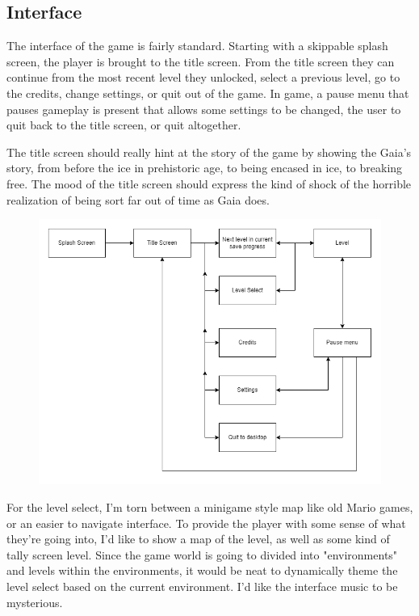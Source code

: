 \documentclass[12pt]{report}
\begin{document}
\pagebreak
\subsection*{Interface}

The interface of the game is fairly standard. Starting with a skippable splash screen,
the player is brought to the title screen. From the title screen they can continue from 
the most recent level they unlocked, select a previous level, go to the credits, change 
settings, or quit out of the game. In game, a pause menu that pauses gameplay is present
that allows some settings to be changed, the user to quit back to the title screen, or quit
altogether. 

The title screen should really hint at the story of the game by showing the 
Gaia's story, from before the ice in prehistoric age, to being encased in ice, to breaking
free. The mood of the title screen should express the kind of shock of the horrible 
realization of being sort far out of time as Gaia does.

\begin{figure}[ht]
    \centering
    \includegraphics[width=5in]{img/game_flow.png}
\end{figure}

For the level select, I'm torn between a minigame style map like old Mario games, or an 
easier to navigate interface. To provide the player with some sense of what they're going 
into, I'd like to show a map of the level, as well as some kind of tally screen level. Since
the game world is going to divided into "environments" and levels within the environments, 
it would be neat to dynamically theme the level select based on the current environment.
I'd like the interface music to be mysterious.
\end{document}
